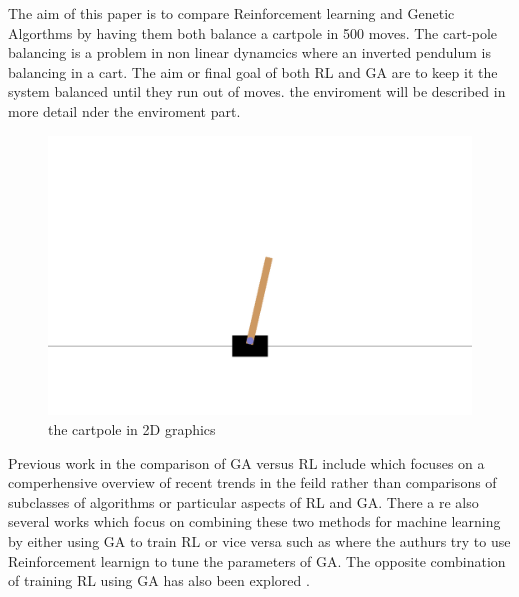 The aim of this paper is to compare Reinforcement learning and Genetic Algorthms by having them both balance a cartpole in 500 moves. 
The cart-pole balancing is a problem in non linear dynamcics where an inverted pendulum is balancing in a cart. The aim or final goal of both RL and GA are to keep it the system balanced until they run out of moves. the enviroment will be described in more detail nder the enviroment part.  
\begin{figure}[H]
    \centering
    \includegraphics [scale = 0.2]{Images/cartpole.png}
    \caption{the cartpole in 2D graphics}
    \label{figRL}
\end{figure}
Previous work in the comparison of GA versus RL include \cite{drugan2019reinforcement} which focuses on a comperhensive overview of recent trends in the feild rather than comparisons of subclasses of algorithms or particular aspects of RL and GA. There a re also several works which focus on combining these two methods for machine learning by either using GA to train RL or vice versa such as \cite{eiben2007reinforcement} where the authurs try to use Reinforcement learnign to tune the parameters of GA. The opposite combination of training RL using GA has also been explored \cite{khadka2018evolutionary}.



